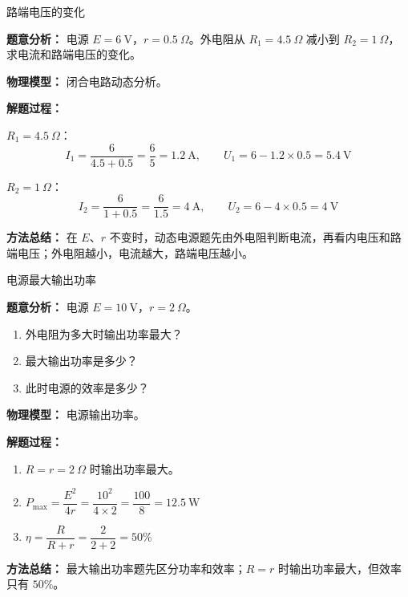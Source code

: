 \begin{examplebox}{路端电压的变化}

\textbf{题意分析：} 电源 $E = 6\ \mathrm{V}$，$r = 0.5\ \Omega$。外电阻从 $R_1 = 4.5\ \Omega$ 减小到 $R_2 = 1\ \Omega$，求电流和路端电压的变化。

\textbf{物理模型：} 闭合电路动态分析。

\begin{center}


\label{fig:terminal-voltage-change}
\end{center}

\textbf{解题过程：}

$R_1 = 4.5\ \Omega$：
\[
I_1 = \frac{6}{4.5 + 0.5} = \frac{6}{5} = 1.2\ \mathrm{A},\qquad
U_1 = 6 - 1.2 \times 0.5 = 5.4\ \mathrm{V}
\]

$R_2 = 1\ \Omega$：
\[
I_2 = \frac{6}{1 + 0.5} = \frac{6}{1.5} = 4\ \mathrm{A},\qquad
U_2 = 6 - 4 \times 0.5 = 4\ \mathrm{V}
\]

\textbf{方法总结：} 在 $E$、$r$ 不变时，动态电源题先由外电阻判断电流，再看内电压和路端电压；外电阻越小，电流越大，路端电压越小。

\end{examplebox}

\begin{examplebox}{电源最大输出功率}

\textbf{题意分析：} 电源 $E = 10\ \mathrm{V}$，$r = 2\ \Omega$。
\begin{enumerate}
  \item 外电阻为多大时输出功率最大？
  \item 最大输出功率是多少？
  \item 此时电源的效率是多少？
\end{enumerate}

\textbf{物理模型：} 电源输出功率。

\begin{center}


\label{fig:max-power-example}
\end{center}

\textbf{解题过程：}

\begin{enumerate}
  \item $R = r = 2\ \Omega$ 时输出功率最大。

  \item $P_{\max} = \dfrac{E^2}{4r} = \dfrac{10^2}{4 \times 2} = \dfrac{100}{8} = 12.5\ \mathrm{W}$

  \item $\eta = \dfrac{R}{R+r} = \dfrac{2}{2+2} = 50\%$
\end{enumerate}

\textbf{方法总结：} 最大输出功率题先区分功率和效率；$R=r$ 时输出功率最大，但效率只有 $50\%$。

\end{examplebox}

